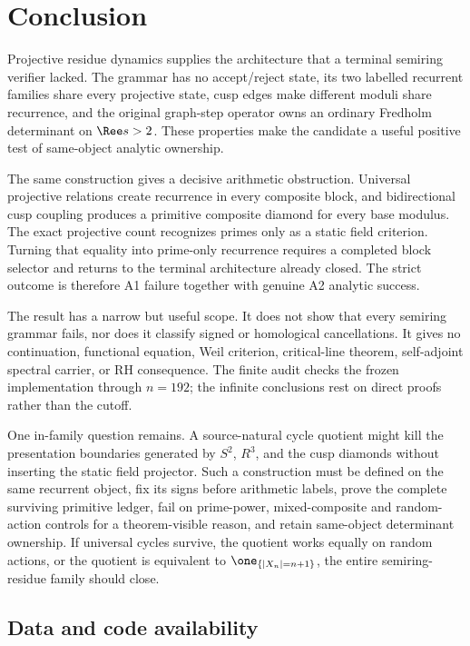 \section{Conclusion}
\label{sec:conclusion}

Projective residue dynamics supplies the architecture that a terminal
semiring verifier lacked.  The grammar has no accept/reject state, its two
labelled recurrent families share every projective state, cusp edges make
different moduli share recurrence, and the original graph-step operator owns
an ordinary Fredholm determinant on $\Ree s>2$.  These properties make the
candidate a useful positive test of same-object analytic ownership.

The same construction gives a decisive arithmetic obstruction.  Universal
projective relations create recurrence in every composite block, and
bidirectional cusp coupling produces a primitive composite diamond for every
base modulus.  The exact projective count recognizes primes only as a static
field criterion.  Turning that equality into prime-only recurrence requires
a completed block selector and returns to the terminal architecture already
closed.  The strict outcome is therefore A1 failure together with genuine A2
analytic success.

The result has a narrow but useful scope.  It does not show that every
semiring grammar fails, nor does it classify signed or homological
cancellations.  It gives no continuation, functional equation, Weil
criterion, critical-line theorem, self-adjoint spectral carrier, or RH
consequence.  The finite audit checks the frozen implementation through
$n=192$; the infinite conclusions rest on direct proofs rather than the
cutoff.

One in-family question remains.  A source-natural cycle quotient might kill
the presentation boundaries generated by $S^2$, $R^3$, and the cusp diamonds
without inserting the static field projector.  Such a construction must be
defined on the same recurrent object, fix its signs before arithmetic labels,
prove the complete surviving primitive ledger, fail on prime-power,
mixed-composite and random-action controls for a theorem-visible reason, and
retain same-object determinant ownership.  If universal cycles survive, the
quotient works equally on random actions, or the quotient is equivalent to
$\one_{\{|X_n|=n+1\}}$, the entire semiring-residue family should close.

\subsection*{Data and code availability}

